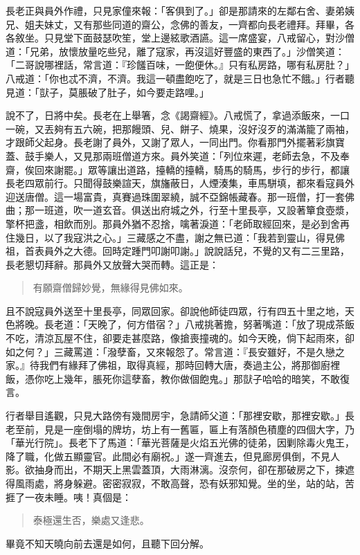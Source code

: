 長老正與員外作禮，只見家僮來報：「客俱到了。」卻是那請來的左鄰右舍、妻弟姨兄、姐夫妹丈，又有那些同道的齋公，念佛的善友，一齊都向長老禮拜。拜畢，各各敘坐。只見堂下面鼓瑟吹笙，堂上邊絃歌酒讌。這一席盛宴，八戒留心，對沙僧道：「兄弟，放懷放量吃些兒，離了寇家，再沒這好豐盛的東西了。」沙僧笑道：「二哥說哪裡話，常言道：『珍饈百味，一飽便休。』只有私房路，哪有私房肚？」八戒道：「你也忒不濟，不濟。我這一頓盡飽吃了，就是三日也急忙不餓。」行者聽見道：「獃子，莫脹破了肚子，如今要走路哩。」

說不了，日將中矣。長老在上舉箸，念《謁齋經》。八戒慌了，拿過添飯來，一口一碗，又丟夠有五六碗，把那饅頭、兒、餅子、燒果，沒好沒歹的滿滿籠了兩袖，才跟師父起身。長老謝了員外，又謝了眾人，一同出門。你看那門外擺著彩旗寶蓋、鼓手樂人，又見那兩班僧道方來。員外笑道：「列位來遲，老師去急，不及奉齋，俟回來謝罷。」眾等讓出道路，擡轎的擡轎，騎馬的騎馬，步行的步行，都讓長老四眾前行。只聞得鼓樂諠天，旗旛蔽日，人煙湊集，車馬駢填，都來看寇員外迎送唐僧。這一場富貴，真賽過珠圍翠繞，誠不亞錦帳藏春。那一班僧，打一套佛曲；那一班道，吹一道玄音。俱送出府城之外，行至十里長亭，又設著簞食壺漿，擎杯把盞，相飲而別。那員外猶不忍捨，噙著淚道：「老師取經回來，是必到舍再住幾日，以了我寇洪之心。」三藏感之不盡，謝之無已道：「我若到靈山，得見佛祖，首表員外之大德。回時定踵門叩謝叩謝。」說說話兒，不覺的又有二三里路，長老懇切拜辭。那員外又放聲大哭而轉。這正是：
\begin{quote}
有願齋僧歸妙覺，無緣得見佛如來。
\end{quote}

且不說寇員外送至十里長亭，同眾回家。卻說他師徒四眾，行有四五十里之地，天色將晚。長老道：「天晚了，何方借宿？」八戒挑著擔，努著嘴道：「放了現成茶飯不吃，清涼瓦屋不住，卻要走甚麼路，像搶喪撞魂的。如今天晚，倘下起雨來，卻如之何？」三藏罵道：「潑孽畜，又來報怨了。常言道：『長安雖好，不是久戀之家。』待我們有緣拜了佛祖，取得真經，那時回轉大唐，奏過主公，將那御廚裡飯，憑你吃上幾年，脹死你這孽畜，教你做個飽鬼。」那獃子哈哈的暗笑，不敢復言。

行者舉目遙觀，只見大路傍有幾間房宇，急請師父道：「那裡安歇，那裡安歇。」長老至前，見是一座倒塌的牌坊，坊上有一舊匾，匾上有落顏色積塵的四個大字，乃「華光行院」。長老下了馬道：「華光菩薩是火焰五光佛的徒弟，因剿除毒火鬼王，降了職，化做五顯靈官。此間必有廟祝。」遂一齊進去，但見廊房俱倒，不見人影。欲抽身而出，不期天上黑雲蓋頂，大雨淋漓。沒奈何，卻在那破房之下，揀遮得風雨處，將身躲避。密密寂寂，不敢高聲，恐有妖邪知覺。坐的坐，站的站，苦捱了一夜未睡。咦！真個是：
\begin{quote}
泰極還生否，樂處又逢悲。
\end{quote}

畢竟不知天曉向前去還是如何，且聽下回分解。
